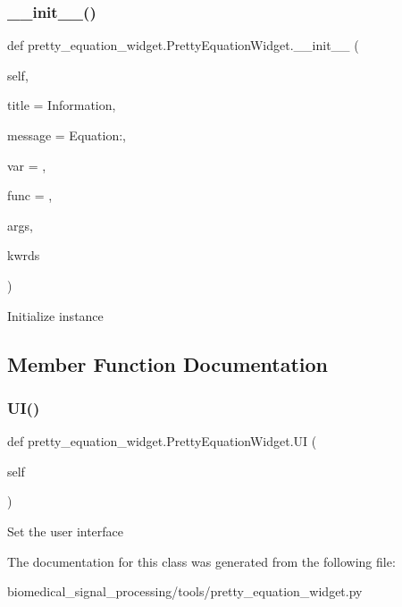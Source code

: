 \subsubsection{\texorpdfstring{\+\_\+\+\_\+init\+\_\+\+\_\+()}{\_\_init\_\_()}}
{\footnotesize\ttfamily def pretty\+\_\+equation\+\_\+widget.\+Pretty\+Equation\+Widget.\+\_\+\+\_\+init\+\_\+\+\_\+ (\begin{DoxyParamCaption}\item[{}]{self,  }\item[{}]{title = {\ttfamily \textquotesingle{}Information\textquotesingle{}},  }\item[{}]{message = {\ttfamily \textquotesingle{}Equation\+:\textquotesingle{}},  }\item[{}]{var = {\ttfamily \textquotesingle{}\textquotesingle{}},  }\item[{}]{func = {\ttfamily \textquotesingle{}\textquotesingle{}},  }\item[{}]{args,  }\item[{}]{kwrds }\end{DoxyParamCaption})}

\begin{DoxyVerb}Initialize instance
\end{DoxyVerb}
 

\subsection{Member Function Documentation}
\mbox{\label{classpretty__equation__widget_1_1PrettyEquationWidget_ac7ed9c1b6c285ceac95cd2abfe7d6a05}} 
\subsubsection{\texorpdfstring{U\+I()}{UI()}}
{\footnotesize\ttfamily def pretty\+\_\+equation\+\_\+widget.\+Pretty\+Equation\+Widget.\+UI (\begin{DoxyParamCaption}\item[{}]{self }\end{DoxyParamCaption})}

\begin{DoxyVerb}Set the user interface
\end{DoxyVerb}
 

The documentation for this class was generated from the following file\+:\begin{DoxyCompactItemize}
\item 
biomedical\+\_\+signal\+\_\+processing/tools/pretty\+\_\+equation\+\_\+widget.\+py\end{DoxyCompactItemize}
